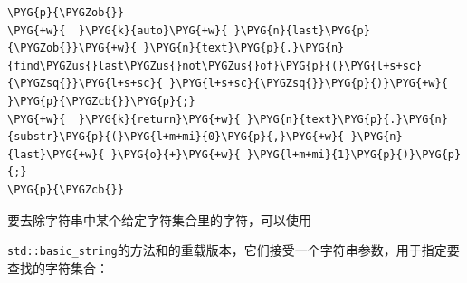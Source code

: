 \begin{codeblockbg}
\begin{Verbatim}[commandchars=\\\{\},breaklines=true,breakanywhere=true,fontsize=\codefont,xleftmargin=17bp]
\PYG{p}{\PYGZob{}}
\PYG{+w}{  }\PYG{k}{auto}\PYG{+w}{ }\PYG{n}{last}\PYG{p}{\PYGZob{}}\PYG{+w}{ }\PYG{n}{text}\PYG{p}{.}\PYG{n}{find\PYGZus{}last\PYGZus{}not\PYGZus{}of}\PYG{p}{(}\PYG{l+s+sc}{\PYGZsq{}}\PYG{l+s+sc}{ }\PYG{l+s+sc}{\PYGZsq{}}\PYG{p}{)}\PYG{+w}{ }\PYG{p}{\PYGZcb{}}\PYG{p}{;}
\PYG{+w}{  }\PYG{k}{return}\PYG{+w}{ }\PYG{n}{text}\PYG{p}{.}\PYG{n}{substr}\PYG{p}{(}\PYG{l+m+mi}{0}\PYG{p}{,}\PYG{+w}{ }\PYG{n}{last}\PYG{+w}{ }\PYG{o}{+}\PYG{+w}{ }\PYG{l+m+mi}{1}\PYG{p}{)}\PYG{p}{;}
\PYG{p}{\PYGZcb{}}
\end{Verbatim}
\end{codeblockbg}



要去除字符串中某个给定字符集合里的字符，可以使用



\texttt{std::\allowbreak{}basic\_\allowbreak{}string}的方法和的重载版本，它们接受一个字符串参数，用于指定要查找的字符集合：




